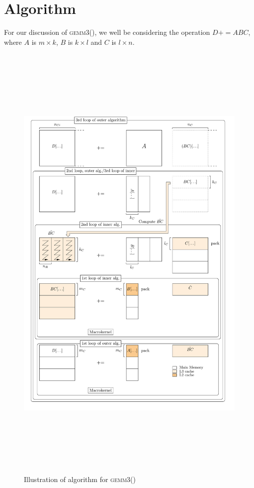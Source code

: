 \documentclass[12pt]{article}
\newcommand*{\pluseq}{\mathrel{{+}{=}}}
\newcommand*{\gemmt}{{\textsc{gemm3()}}}
\begin{document}
\section{Algorithm}
For our discussion of \gemmt{}, we well be considering the operation $D \pluseq ABC$, where $A$ is $m \times k$, $B$ is $k \times l$ and $C$ is $l \times n$.
\begin{figure}
  \centering
  \includegraphics[height=8.75in]{gemm3-picture}
  \caption{Illustration of algorithm for \gemmt{}}
  \label{fig:gemm3}
\end{figure}
\end{document}
